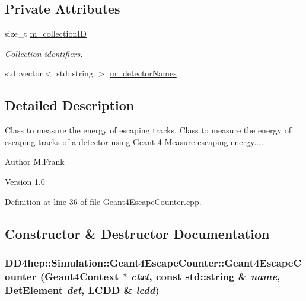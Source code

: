 \subsection*{Private Attributes}
\begin{DoxyCompactItemize}
\item 
size\_\-t \hyperlink{class_d_d4hep_1_1_simulation_1_1_geant4_escape_counter_a4705f9b7bb31e8f42d05186889ec9729}{m\_\-collectionID}
\begin{DoxyCompactList}\small\item\em Collection identifiers. \item\end{DoxyCompactList}\item 
std::vector$<$ std::string $>$ \hyperlink{class_d_d4hep_1_1_simulation_1_1_geant4_escape_counter_a64b874d036145e35f7ee6d77cfe11209}{m\_\-detectorNames}
\end{DoxyCompactItemize}


\subsection{Detailed Description}
Class to measure the energy of escaping tracks. Class to measure the energy of escaping tracks of a detector using Geant 4 Measure escaping energy....

\begin{DoxyAuthor}{Author}
M.Frank 
\end{DoxyAuthor}
\begin{DoxyVersion}{Version}
1.0 
\end{DoxyVersion}


Definition at line 36 of file Geant4EscapeCounter.cpp.

\subsection{Constructor \& Destructor Documentation}
\hypertarget{class_d_d4hep_1_1_simulation_1_1_geant4_escape_counter_a99f1af6fc1a64bf6add2abacd410d310}{
\subsubsection[{Geant4EscapeCounter}]{\setlength{\rightskip}{0pt plus 5cm}DD4hep::Simulation::Geant4EscapeCounter::Geant4EscapeCounter ({\bf Geant4Context} $\ast$ {\em ctxt}, \/  const std::string \& {\em name}, \/  {\bf DetElement} {\em det}, \/  {\bf LCDD} \& {\em lcdd})}}
\label{class_d_d4hep_1_1_simulation_1_1_geant4_escape_counter_a99f1af6fc1a64bf6add2abacd410d310}


